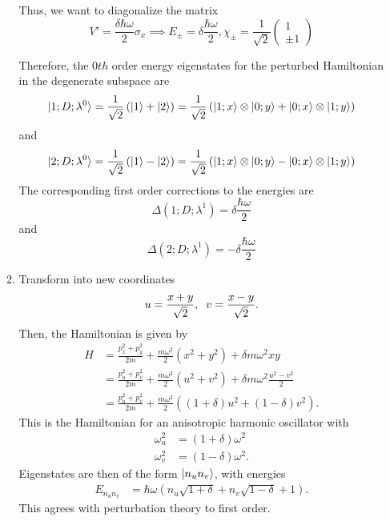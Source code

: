 \documentclass[12pt, letterpaper]{article}
\begin{document}
\begin{enumerate}
\begin{enumerate}
Thus, we want to diagonalize the matrix 
\begin{equation}
        V'=\frac{\delta \hbar \omega}{2}\sigma_x\implies E_{\pm}=\delta\frac{\hbar \omega}{2},\chi_{\pm}=\frac{1}{\sqrt{2}}\left(\begin{array}{c}1\\\pm 1\end{array}\right)
\end{equation}

Therefore, the $0th$ order energy eigenstates for the perturbed Hamiltonian in the degenerate subspace are
\begin{equation}
        \ket{1;D;\lambda^0}=\frac{1}{\sqrt{2}}\left(\ket{1}+\ket{2}\right)=\frac{1}{\sqrt{2}}\left(\ket{1;x}\otimes \ket{0;y}+\ket{0;x}\otimes \ket{1;y}\right)
\end{equation}
and 
\begin{equation}
        \ket{2;D;\lambda^0}=\frac{1}{\sqrt{2}}\left(\ket{1}-\ket{2}\right)=\frac{1}{\sqrt{2}}\left(\ket{1;x}\otimes \ket{0;y}-\ket{0;x}\otimes \ket{1;y}\right)
\end{equation}
The corresponding first order corrections to the energies are
\begin{equation}
        \Delta(1;D;\lambda^1)=\delta \frac{\hbar \omega}{2}
\end{equation}
and 
\begin{equation}
        \Delta(2;D;\lambda^1)=-\delta \frac{\hbar \omega}{2}
\end{equation}
\item 
Transform into new coordinates
\begin{align}
u=\frac{x+y}{\sqrt{2}},\hspace{2mm} v=\frac{x-y}{\sqrt{2}}.
\end{align}
Then, the Hamiltonian is given by
\begin{align}
H&=\frac{p_x^2+p_y^2}{2m}+\frac{m\omega^2}{2}(x^2+y^2)+\delta m\omega^2xy\\
&= \frac{p_u^2+p_v^2}{2m} + \frac{m\omega^2}{2} (u^2+v^2) + \delta m\omega^2
    \frac{u^2-v^2}{2}\\
&= \frac{p_u^2+p_v^2}{2m} + \frac{m\omega^2}{2} \left((1 + \delta)u^2
    +(1-\delta)v^2\right).
\end{align}
This is the Hamiltonian for an anisotropic harmonic oscillator with 
\begin{align}
\omega_u^2&=(1 + \delta)\omega^2\\
\omega_v^2&=(1 - \delta)\omega^2.
\end{align}
Eigenstates are then of the form $\ket{n_un_v}$, with energies 
\begin{align}
E_{n_un_v} &= \hbar\omega\left(n_u\sqrt{1 + \delta}+ 
    n_v\sqrt{1 - \delta} +1\right).
\end{align}
This agrees with perturbation theory to first order.
\end{enumerate}
    

\end{enumerate}
\end{document}

